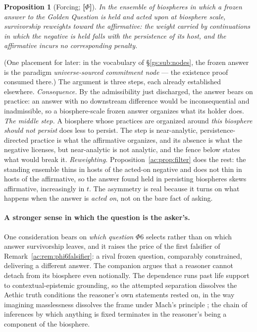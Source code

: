 \documentclass[11pt]{article}
\numberwithin{equation}{section}
\theoremstyle{plain}
\newtheorem{proposition}[theorem]{Proposition}
\theoremstyle{definition}
\theoremstyle{remark}
\begin{document}
\begin{proposition}[Forcing; \textbf{[$\Phi$]}]\label{ac:prop:forcing}
In the ensemble of biospheres in which a frozen answer to the Golden Question is held and acted upon at biosphere scale, survivorship reweights toward the affirmative: the weight carried by continuations in which the negative is held falls with the persistence of its host, and the affirmative incurs no corresponding penalty.
\end{proposition}

\noindent (One placement for later: in the vocabulary of
\S\ref{gs:sub:nodes}, the frozen answer is the paradigm
\emph{universe-sourced commitment node} --- the existence proof
consumed there.) The argument is three steps, each already established elsewhere. \emph{Consequence.} By the admissibility just discharged, the answer bears on practice: an answer with no downstream difference would be inconsequential and inadmissible, so a biosphere-scale frozen answer organizes what its holder does. \emph{The middle step.} A biosphere whose practices are organized around \emph{this biosphere should not persist} does less to persist. The step is near-analytic, persistence-directed practice is what the affirmative organizes, and its absence is what the negative licenses, but near-analytic is not analytic, and the fence below states what would break it. \emph{Reweighting.} Proposition~\ref{ac:prop:filter} does the rest: the standing ensemble thins in hosts of the acted-on negative and does not thin in hosts of the affirmative, so the answer found held in persisting biospheres skews affirmative, increasingly in $t$. The asymmetry is real because it turns on what happens when the answer is \emph{acted on}, not on the bare fact of asking.

\paragraph{A stronger sense in which the question is the asker's.}\label{ac:rem:indecomposable}
One consideration bears on \emph{which question} $\Phi6$ selects rather
than on which answer survivorship leaves, and it raises the price of the
first falsifier of Remark~\ref{ac:rem:phi6falsifier}: a rival frozen
question, comparably constrained, delivering a different answer. The companion argues that a reasoner cannot detach from its biosphere
even notionally. The dependence runs past life support to
contextual-epistemic grounding, so the attempted separation dissolves the
Aethic truth conditions the reasoner's own statements rested on, in the
way imagining masslessness dissolves the frame under Mach's principle
\cite{Nexus, Barbour1995}; the chain of inferences by which anything is
fixed terminates in the reasoner's being a component of the biosphere.
\end{document}
